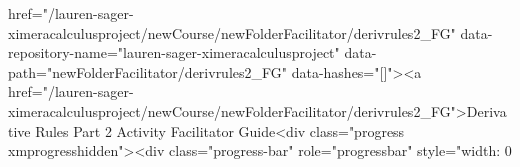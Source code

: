 href="/lauren-sager-ximeracalculusproject/newCourse/newFolderFacilitator/derivrules2_FG" data-repository-name="lauren-sager-ximeracalculusproject" data-path="newFolderFacilitator/derivrules2_FG" data-hashes="[]"><a href="/lauren-sager-ximeracalculusproject/newCourse/newFolderFacilitator/derivrules2_FG">Derivative Rules Part 2 Activity Facilitator Guide<div class="progress xmprogresshidden"><div class="progress-bar" role="progressbar" style="width: 0%